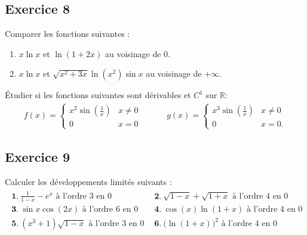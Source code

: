 \documentclass[letterpaper,10pt,french]{jupyterBook}
\begin{document}
\subsection{Exercice 8}
\label{\detokenize{exo6:exercice-8}}
\sphinxAtStartPar
Comparer les fonctions suivantes :
\begin{enumerate}
%
\item {} 
\sphinxAtStartPar
\(x\ln x\) et \(\ln(1+2x)\) au voisinage de \(0\).

\item {} 
\sphinxAtStartPar
\(x\ln x\) et \(\sqrt{x^2+3x}\ln(x^2)\sin x\) au voisinage de \(+\infty\).

\end{enumerate}

\sphinxAtStartPar
Étudier si les fonctions suivantes sont dérivables et \(C^1\) sur \(\mathbb{R}\):
\begin{equation*}
\begin{split}
f(x)=\left\{\begin{array}{ll}
x^2\sin\left(\frac 1x\right)&x\neq 0\\
0&x=0
\end{array}\right.\quad\quad\quad
g(x)=\left\{\begin{array}{ll}
x^3\sin\left(\frac 1x\right)&x\neq 0\\
0&x=0.
\end{array}\right.
\end{split}
\end{equation*}

\subsection{Exercice 9}
\label{\detokenize{exo6:exercice-9}}
\sphinxAtStartPar
Calculer les développements limités suivants :
\begin{equation*}
\begin{split}
\begin{array}{lcl}
\displaystyle \mathbf 1.\ \frac{1}{1-x}-e^x\textrm{ à l'ordre 3 en 0}&&\displaystyle \mathbf 2.\ \sqrt{1-x}+\sqrt{1+x}\textrm{ à l'ordre 4 en 0}\\
\displaystyle \mathbf 3.\ \sin x\cos(2x)\textrm{ à l'ordre 6 en 0}&&\displaystyle \mathbf 4.\ \cos(x)\ln(1+x)\textrm{ à l'ordre 4 en 0}\\
\displaystyle \mathbf 5.\ (x^3+1)\sqrt{1-x}\textrm{ à l'ordre 3 en 0}&&\displaystyle \mathbf 6.\ \big(\ln(1+x)\big)^2\textrm{ à l'ordre 4 en 0}
\end{array}
\end{split}
\end{equation*}
\end{document}
